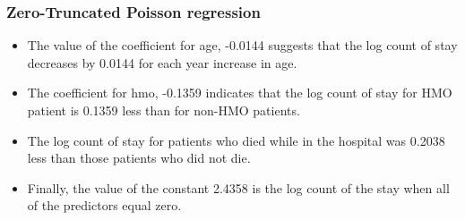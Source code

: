 \documentclass[MASTER.tex]{subfiles}
\begin{document}
\begin{frame}
	\frametitle{Zero-Truncated Poisson regression}
	\large

\begin{itemize}
\item The value of the coefficient for age, -0.0144 suggests that the log count of stay decreases by 0.0144 for each year increase in age.
\item The coefficient for hmo, -0.1359 indicates that the log count of stay for HMO patient is 0.1359 less than for non-HMO patients.
\item The log count of stay for patients who died while in the hospital was 0.2038 less than those patients who did not die.
\item Finally, the value of the constant 2.4358 is the log count of the stay when all of the predictors equal zero.
\end{itemize}
\end{frame}
\end{document}
